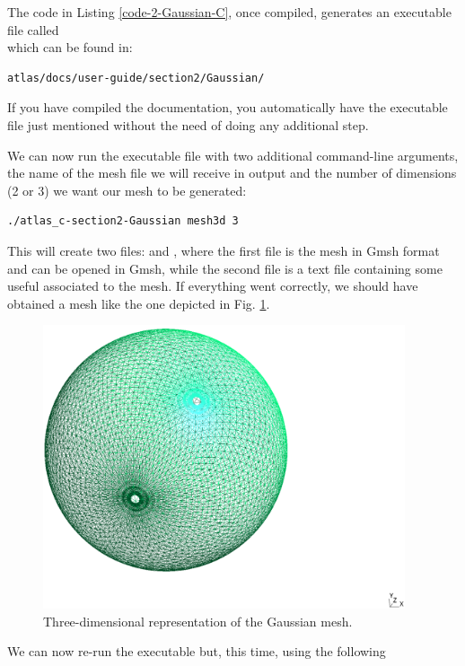 The code in Listing \ref{code-2-Gaussian-C}, once compiled, generates 
an executable file called \\ 
 which can be found in:
%
\begin{lstlisting}[style=BashStyle]
atlas/docs/user-guide/section2/Gaussian/
\end{lstlisting}
% 
\begin{notebox}
If you have compiled the documentation, you automatically have 
the executable file just mentioned without the need of doing 
any additional step.
\end{notebox}
%
We can now run the executable file with two additional command-line 
arguments, the name of the mesh file we will receive in output and 
the number of dimensions (2 or 3) we want our mesh to be generated:
%
\begin{lstlisting}[style=BashStyle]
./atlas_c-section2-Gaussian mesh3d 3
\end{lstlisting}
% 
This will create two files:  and , 
where the first file is the mesh in Gmsh format and can be opened 
in Gmsh, while the second file is a text file containing some useful 
associated to the mesh.
If everything went correctly, we should have obtained a mesh like 
the one depicted in Fig. \ref{fig:section2-Gaussian-3d}.
%
\begin{figure}[H]
  \centering
    \includegraphics[width=0.95\textwidth]{imgs/Gaussian_3d}
    \caption{Three-dimensional representation of the Gaussian mesh.}
    \label{fig:section2-Gaussian-3d}
\end{figure}
%
We can now re-run the executable but, this time, using the following
